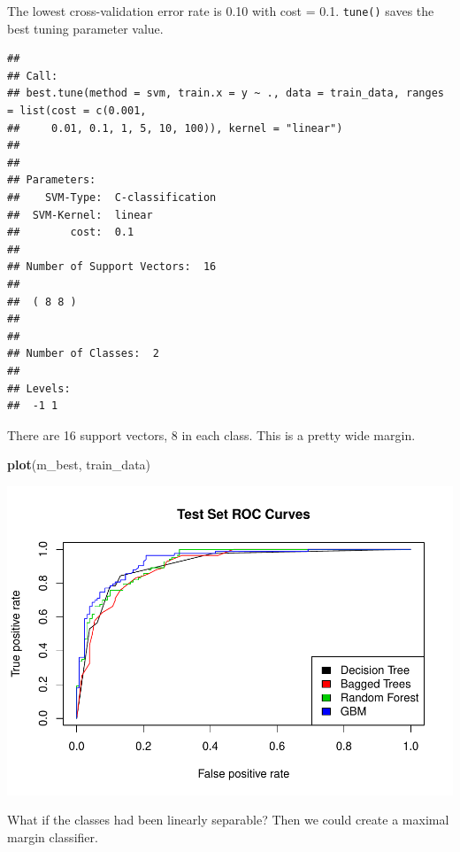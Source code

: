 \documentclass[]{book}
\newenvironment{Shaded}{\begin{snugshade}}{\end{snugshade}}
\newcommand{\KeywordTok}[1]{\textcolor[rgb]{0.13,0.29,0.53}{\textbf{#1}}}
\newcommand{\NormalTok}[1]{#1}
\newcommand{\OperatorTok}[1]{\textcolor[rgb]{0.81,0.36,0.00}{\textbf{#1}}}
\newcommand{\StringTok}[1]{\textcolor[rgb]{0.31,0.60,0.02}{#1}}
\begin{document}
The lowest cross-validation error rate is 0.10 with cost = 0.1. \texttt{tune()} saves the best tuning parameter value.

\begin{Shaded}
\end{Shaded}

\begin{verbatim}
## 
## Call:
## best.tune(method = svm, train.x = y ~ ., data = train_data, ranges = list(cost = c(0.001, 
##     0.01, 0.1, 1, 5, 10, 100)), kernel = "linear")
## 
## 
## Parameters:
##    SVM-Type:  C-classification 
##  SVM-Kernel:  linear 
##        cost:  0.1 
## 
## Number of Support Vectors:  16
## 
##  ( 8 8 )
## 
## 
## Number of Classes:  2 
## 
## Levels: 
##  -1 1
\end{verbatim}

There are 16 support vectors, 8 in each class. This is a pretty wide margin.

\begin{Shaded}
\begin{Highlighting}[]
\KeywordTok{plot}\NormalTok{(m_best, train_data)}
\end{Highlighting}
\end{Shaded}

\includegraphics{data-sci_files/figure-latex/unnamed-chunk-99-1.pdf}

What if the classes had been linearly separable? Then we could create a maximal margin classifier.
\end{document}
